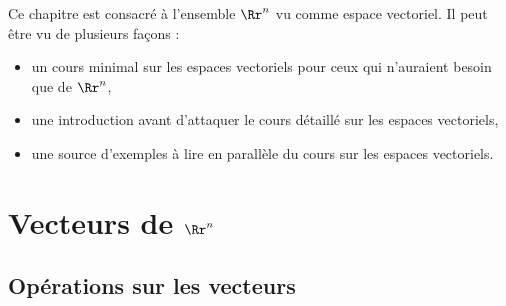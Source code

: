 \documentclass[class=report,crop=false]{standalone}
\begin{document}





\bigskip

Ce chapitre est consacré à l'ensemble $\Rr^n$ vu comme espace vectoriel.
Il peut être vu de plusieurs façons :
\begin{itemize}
  \item un cours minimal sur les espaces vectoriels pour ceux qui n'auraient besoin que
  de $\Rr^n$,

  \item une introduction avant d'attaquer le cours détaillé sur les espaces vectoriels,

  \item une source d'exemples à lire en parallèle du cours sur les espaces vectoriels.
\end{itemize}




\section{Vecteurs de $\Rr^n$}

\subsection{Opérations sur les vecteurs}
\end{document}
